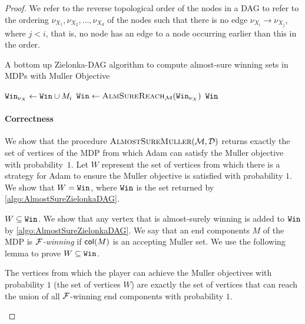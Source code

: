\begin{proof}
        We refer to the reverse topological order of the nodes in a DAG to refer to the ordering $\nu_{X_1},\nu_{X_2},\dots,\nu_{X_d}$ of the nodes such that there is no edge $\nu_{X_i}\rightarrow\nu_{X_j}$, where $j<i$, that is, no node has an edge to a node occurring earlier than this in the order. 
        \begin{algorithm}
            \begin{algorithmic}\caption{A bottom up Zielonka-DAG algorithm to compute almost-sure winning sets in MDPs with Muller Objective}\label{algo:AlmostSureZielonkaDAG}
                    \State {}
                \EndProcedure
                                    \State $\texttt{Win}_{\nu_X}\gets\texttt{Win}\cup M_i$
                                    \State $\texttt{Win}\gets\textsc{AlmSureReach}_{\mathcal{M}}(\texttt{Win}_{\nu_X})$
                                    \EndIf
                                \EndFor
                            \EndIf
                        \EndFor
                    \Return $\texttt{Win}$
                \EndProcedure
            \end{algorithmic}
            \end{algorithm}
    \paragraph*{Correctness}
    We show that the procedure $\textsc{AlmostSureMuller}(\mathcal{M},\mathcal{D})$ returns exactly the set of vertices of the MDP from which Adam can satisfy the Muller objective with probability~$1$. 
    Let $W$ represent the set of vertices from which there is a strategy for Adam to ensure the Muller objective is satisfied with probability $1$. We show that $W = \texttt{Win}$, where $\texttt{Win}$ is the set returned by \cref{algo:AlmostSureZielonkaDAG}.  
    
    $W\subseteq\texttt{Win}$. 
    We show that any vertex that is almost-surely winning is added to $\texttt{Win}$ by \cref{algo:AlmostSureZielonkaDAG}. We say that an end components $M$ of the MDP is \emph{$\mathcal{F}$-winning} if ${\mathsf{col}}(M)$ is an accepting Muller set. 
    We use the following lemma to prove $W\subseteq\texttt{Win}$.
    \begin{lemma}\label{lemma:Cha07Union}
        The vertices from which the player can achieve the Muller objectives with probability $1$ (the set of vertices $W$) are exactly the set of vertices that  can reach the union of all $\mathcal{F}$-winning end components with probability $1$.
    \end{lemma}
    

\end{proof}
